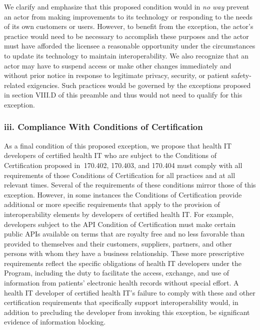 \documentclass[twoside,11pt]{article}
\begin{document}
          We clarify and emphasize that this proposed condition would in \emph{no way} prevent an actor from making improvements to its technology or responding to the needs of its own customers or users. However, to benefit from the exception, the actor's practice would need to be necessary to accomplish these purposes and the actor must have afforded the licensee a reasonable opportunity under the circumstances to update its technology to maintain interoperability. We also recognize that an actor may have to suspend access or make other changes immediately and without prior notice in response to legitimate privacy, security, or patient safety-related exigencies. Such practices would be governed by the exceptions proposed in section VIII.D of this preamble and thus would not need to qualify for this exception.


          \subsubsection{iii. Compliance With Conditions of Certification}

          As a final condition of this proposed exception, we propose that health IT developers of certified health IT who are subject to the Conditions of Certification proposed in \textsection{}\textsection{} 170.402, 170.403, and 170.404 must comply with all requirements of those Conditions of Certification for all practices and at all relevant times. Several of the requirements of these conditions mirror those of this exception. However, in some instances the Conditions of Certification provide additional or more specific requirements that apply to the provision of interoperability elements by developers of certified health IT. For example, developers subject to the API Condition of Certification must make certain public APIs available on terms that are royalty free and no less favorable than provided to themselves and their customers, suppliers, partners, and other persons with whom they have a business relationship. These more prescriptive requirements reflect the specific obligations of health IT developers under the Program, including the duty to facilitate the access, exchange, and use of information from patients' electronic health records without special effort. A health IT developer of certified health IT's failure to comply with these and other certification requirements that specifically support interoperability would, in addition to precluding the developer from invoking this exception, be significant evidence of information blocking.
\end{document}
